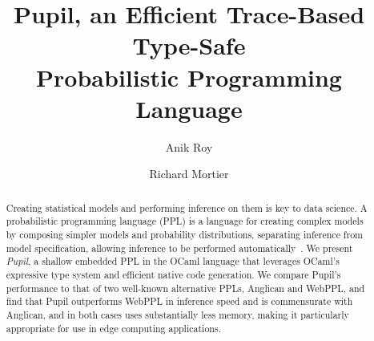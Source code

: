 \documentclass[sigconf,timestamp]{acmart}
\newcommand{\pupil}{Pupil\xspace}
\begin{document}
\title[
  \pupil, an Efficient Trace-Based Type-Safe Probabilistic Programming Language
]{
  \pupil, an Efficient Trace-Based Type-Safe \\
  Probabilistic Programming Language
}

\author{Anik Roy}

\author{Richard Mortier}


\begin{abstract}
  Creating statistical models and performing inference on them is key to data science. A probabilistic programming language (PPL) is a language for creating complex models by composing simpler models and probability distributions, separating inference from model specification, allowing inference to be performed automatically~\cite{gordon2014probabilistic}. We present \emph{\pupil}, a shallow embedded PPL in the OCaml language that leverages OCaml's expressive type system and efficient native code generation. We compare \pupil's performance to that of two well-known alternative PPLs, Anglican and WebPPL, and find that \pupil outperforms WebPPL in inference speed and is commensurate with Anglican, and in both cases uses substantially less memory, making it particularly appropriate for use in edge computing applications.
\end{abstract}
\end{document}
